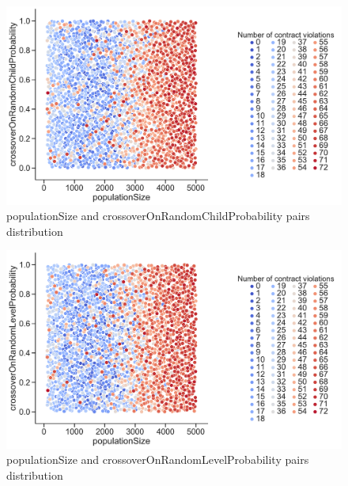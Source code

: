 \begin{figure}
	\centering
	\includegraphics[width=\textwidth]{images/PairsDistr/populationSize_crossoverOnRandomChildProbability.pdf}
	\caption[populationSize and crossoverOnRandomChildProbability pairs distribution]{populationSize and crossoverOnRandomChildProbability pairs distribution}
	\label{fig:populationSize_crossoverOnRandomChildProbability_pair}
\end{figure}
\begin{figure}
	\centering
	\includegraphics[width=\textwidth]{images/PairsDistr/populationSize_crossoverOnRandomLevelProbability.pdf}
	\caption[populationSize and crossoverOnRandomLevelProbability pairs distribution]{populationSize and crossoverOnRandomLevelProbability pairs distribution}
	\label{fig:populationSize_crossoverOnRandomLevelProbability_pair}
\end{figure}
